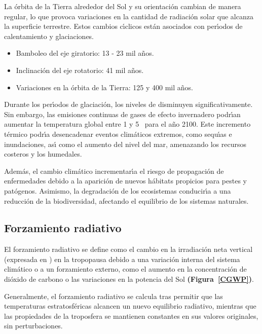 La \'orbita de la Tierra alrededor del Sol y su orientaci\'on cambian de manera regular, lo que provoca variaciones en la cantidad de radiaci\'on solar que alcanza la superficie terrestre. Estos cambios c\'{\i}clicos est\'an asociados con per\'{\i}odos de calentamiento y glaciaciones. 

\begin{itemize}
    \item Bamboleo del eje giratorio: 13 - 23 mil a\~nos.
    \item Inclinaci\'on del eje rotatorio: 41 mil a\~nos.
    \item Variaciones en la \'orbita de la Tierra: 125 y 400 mil a\~nos.
\end{itemize}

Durante los per\'{\i}odos de glaciaci\'on, los niveles de  disminuyen significativamente. Sin embargo, las emisiones continuas de gases de efecto invernadero podr\'{\i}an aumentar la temperatura global entre 1 y 5 \celsius\, para el a\~no 2100. Este incremento t\'ermico podr\'{\i}a desencadenar eventos clim\'aticos extremos, como sequ\'{\i}as e inundaciones, as\'{\i} como el aumento del nivel del mar, amenazando los recursos costeros y los humedales.

Adem\'as, el cambio clim\'atico incrementar\'{\i}a el riesgo de propagaci\'on de enfermedades debido a la aparici\'on de nuevos h\'abitats propicios para pestes y pat\'ogenos. Asimismo, la degradaci\'on de los ecosistemas conducir\'{\i}a a una reducci\'on de la biodiversidad, afectando el equilibrio de los sistemas naturales.

\subsection{Forzamiento radiativo}\label{fradia}

El forzamiento radiativo se define como el cambio en la irradiaci\'on neta vertical (expresada en \wattpersquaremetrenp) en la tropopausa debido a una variaci\'on interna del sistema clim\'atico o a un forzamiento externo, como el aumento en la concentraci\'on de di\'oxido de carbono o las variaciones en la potencia del Sol \textbf{(Figura~\ref{CGWP})}. 

Generalmente, el forzamiento radiativo se calcula tras permitir que las temperaturas estratosf\'ericas alcancen un nuevo equilibrio radiativo, mientras que las propiedades de la troposfera se mantienen constantes en sus valores originales, sin perturbaciones. 


